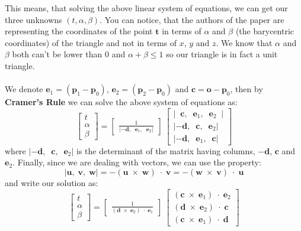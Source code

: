 \documentclass[11pt,a4paper]{article}
\begin{document}
	This means, that solving the above linear system of equations, we can get our three unknowns $(t, \alpha, \beta)$. You can notice, that the authors of the paper are representing the coordinates of the point $\boldsymbol{t}$ in terms of $\alpha$ and $\beta$ (the barycentric coordinates) of the triangle and not in terms of $x$, $y$ and $z$. We know that $\alpha$ and $\beta$ both can't be lower than $0$ and $\alpha + \beta \le 1$ so our triangle is in fact a unit triangle.\\~\\
	\noindent
	We denote $\boldsymbol{e}_{1} = (\boldsymbol{p}_{1} - \boldsymbol{p}_{0})$, $\boldsymbol{e}_{2} = (\boldsymbol{p}_{2} - \boldsymbol{p}_{0})$ and $\boldsymbol{c} = \boldsymbol{o} - \boldsymbol{p}_{0}$, then by \textbf{Cramer's Rule} \cite{cramersrule} we can solve the above system of equations as:
	\[
	\begin{bmatrix}
	t \\
	\alpha \\
	\beta 
	\end{bmatrix} = \left[
	\begin{array}{ccc}
	\frac{1}{|-\boldsymbol{d},\;\;\boldsymbol{e}_{1},\;\;\boldsymbol{e}_{2}|}
	\end{array}
	\right]
	\
	\begin{bmatrix}
	|\;\;\boldsymbol{c},\;\;\boldsymbol{e}_{1},\;\;\boldsymbol{e}_{2}\;\;| \\
	|-\boldsymbol{d},\;\;\boldsymbol{c},\;\;\boldsymbol{e}_{2}| \\
	|-\boldsymbol{d},\;\;\boldsymbol{e}_{1},\;\;\boldsymbol{c}|
	\end{bmatrix}
	\]
	where $|-\boldsymbol{d},\;\;\boldsymbol{c},\;\;\boldsymbol{e}_{2}|$ is the determinant of the matrix having columns, $-\boldsymbol{d}$, $\boldsymbol{c}$ and $\boldsymbol{e}_{2}$. Finally, since we are dealing with vectors, we can use the property: 
	\begin{equation}
	|\boldsymbol{u},\;\boldsymbol{v},\;\boldsymbol{w}| = -(\boldsymbol{u}\;\times\;\boldsymbol{w})\;\cdot\;\boldsymbol{v} = -(\boldsymbol{w}\;\times\;\boldsymbol{v})\;\cdot\;\boldsymbol{u}
	\end{equation}
	and write our solution as:
	\[
	\begin{bmatrix}
	t \\
	\alpha \\
	\beta
	\end{bmatrix} = \left[
	\begin{array}{ccc}
	\frac{1}{(\boldsymbol{d}\;\times\;\boldsymbol{e}_{2})\;\cdot\;\boldsymbol{e}_{1}}
	\end{array}
	\right]
	\
	\begin{bmatrix}
	(\boldsymbol{c}\;\times\;\boldsymbol{e}_{1})\;\cdot\;\boldsymbol{e}_{2} \\
	(\boldsymbol{d}\;\times\;\boldsymbol{e}_{2})\;\cdot\;\boldsymbol{c} \\
	(\boldsymbol{c}\;\times\;\boldsymbol{e}_{1})\;\cdot\;\boldsymbol{d}
	\end{bmatrix}
	\]
\end{document}
